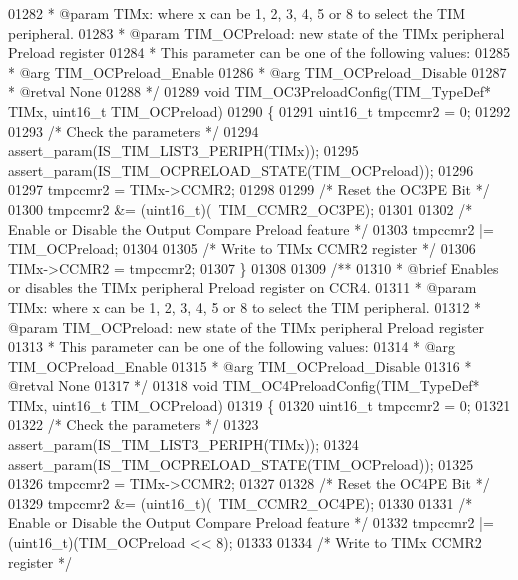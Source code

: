 \begin{DoxyCode}
01282 \textcolor{comment}{  * @param  TIMx: where x can be  1, 2, 3, 4, 5 or 8 to select the TIM peripheral.}
01283 \textcolor{comment}{  * @param  TIM\_OCPreload: new state of the TIMx peripheral Preload register}
01284 \textcolor{comment}{  *          This parameter can be one of the following values:}
01285 \textcolor{comment}{  *            @arg TIM\_OCPreload\_Enable}
01286 \textcolor{comment}{  *            @arg TIM\_OCPreload\_Disable}
01287 \textcolor{comment}{  * @retval None}
01288 \textcolor{comment}{  */}
01289 \textcolor{keywordtype}{void} TIM_OC3PreloadConfig(TIM\_TypeDef* TIMx, uint16\_t TIM\_OCPreload)
01290 \{
01291   uint16\_t tmpccmr2 = 0;
01292 
01293   \textcolor{comment}{/* Check the parameters */}
01294   assert_param(IS\_TIM\_LIST3\_PERIPH(TIMx));
01295   assert_param(IS\_TIM\_OCPRELOAD\_STATE(TIM\_OCPreload));
01296 
01297   tmpccmr2 = TIMx->CCMR2;
01298 
01299   \textcolor{comment}{/* Reset the OC3PE Bit */}
01300   tmpccmr2 &= (uint16\_t)(~TIM_CCMR2_OC3PE);
01301 
01302   \textcolor{comment}{/* Enable or Disable the Output Compare Preload feature */}
01303   tmpccmr2 |= TIM\_OCPreload;
01304 
01305   \textcolor{comment}{/* Write to TIMx CCMR2 register */}
01306   TIMx->CCMR2 = tmpccmr2;
01307 \}
01308 
01309 \textcolor{comment}{/**}
01310 \textcolor{comment}{  * @brief  Enables or disables the TIMx peripheral Preload register on CCR4.}
01311 \textcolor{comment}{  * @param  TIMx: where x can be  1, 2, 3, 4, 5 or 8 to select the TIM peripheral.}
01312 \textcolor{comment}{  * @param  TIM\_OCPreload: new state of the TIMx peripheral Preload register}
01313 \textcolor{comment}{  *          This parameter can be one of the following values:}
01314 \textcolor{comment}{  *            @arg TIM\_OCPreload\_Enable}
01315 \textcolor{comment}{  *            @arg TIM\_OCPreload\_Disable}
01316 \textcolor{comment}{  * @retval None}
01317 \textcolor{comment}{  */}
01318 \textcolor{keywordtype}{void} TIM_OC4PreloadConfig(TIM\_TypeDef* TIMx, uint16\_t TIM\_OCPreload)
01319 \{
01320   uint16\_t tmpccmr2 = 0;
01321 
01322   \textcolor{comment}{/* Check the parameters */}
01323   assert_param(IS\_TIM\_LIST3\_PERIPH(TIMx));
01324   assert_param(IS\_TIM\_OCPRELOAD\_STATE(TIM\_OCPreload));
01325 
01326   tmpccmr2 = TIMx->CCMR2;
01327 
01328   \textcolor{comment}{/* Reset the OC4PE Bit */}
01329   tmpccmr2 &= (uint16\_t)(~TIM_CCMR2_OC4PE);
01330 
01331   \textcolor{comment}{/* Enable or Disable the Output Compare Preload feature */}
01332   tmpccmr2 |= (uint16\_t)(TIM\_OCPreload << 8);
01333 
01334   \textcolor{comment}{/* Write to TIMx CCMR2 register */}

\end{DoxyCode}
